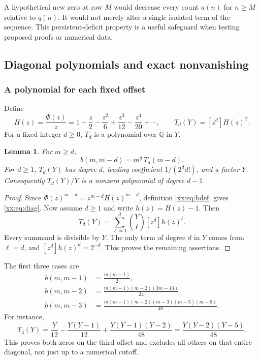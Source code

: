 \documentclass[11pt,a4paper]{article}
\numberwithin{equation}{section}
\newtheorem{lemma}[theorem]{Lemma}
\theoremstyle{definition}
\theoremstyle{remark}
\theoremstyle{plain}
\newcommand{\Q}{\mathbb Q}
\newcommand{\coef}[2]{[#1^{#2}]}
\newcommand{\fall}[2]{#1^{\underline{#2}}}
\begin{document}
A hypothetical new zero at row $M$ would decrease every count $a(n)$ for
$n\ge M$ relative to $q(n)$. It would not merely alter a single isolated
term of the sequence. This persistent-deficit property is a useful safeguard
when testing proposed proofs or numerical data.

\subsection{Diagonal polynomials and exact nonvanishing}\label{xx:sec:diagonals}

\subsubsection{A polynomial for each fixed offset}
Define
\begin{equation}\label{xx:eq:H}
 H(z)=\frac{\Phi(z)}z
 =1+\frac z2-\frac{z^2}{6}+\frac{z^3}{12}-\frac{z^4}{20}+\cdots,
 \qquad T_d(Y)=\coef{z}{d}H(z)^Y.
\end{equation}
For a fixed integer $d\ge0$, $T_d$ is a polynomial over $\Q$ in $Y$.

\begin{lemma}\label{xx:lem:diagdegree}
For $m\ge d$,
\begin{equation}\label{xx:eq:diag}
 b(m,m-d)=\fall m d\,T_d(m-d).
\end{equation}
For $d\ge1$, $T_d(Y)$ has degree $d$, leading coefficient $1/(2^d d!)$,
and a factor $Y$. Consequently $T_d(Y)/Y$ is a nonzero polynomial of
degree $d-1$.
\end{lemma}
\begin{proof}
Since $\Phi(z)^{m-d}=z^{m-d}H(z)^{m-d}$, definition \eqref{xx:eq:bdef} gives
\eqref{xx:eq:diag}. Now assume $d\ge1$ and write $h(z)=H(z)-1$. Then
\begin{equation}\label{xx:eq:Tbinomial}
 T_d(Y)=\sum_{\ell=1}^d\binom Y\ell\coef{z}{d}h(z)^\ell.
\end{equation}
Every summand is divisible by $Y$. The only term of degree $d$ in $Y$
comes from $\ell=d$, and $\coef{z}{d}h(z)^d=2^{-d}$. This proves the
remaining assertions.
\end{proof}

The first three cases are
\begin{align}
 b(m,m-1)&=\frac{m(m-1)}2,\label{xx:eq:d1}\\
 b(m,m-2)&=\frac{m(m-1)(m-2)(3m-13)}{24},\label{xx:eq:d2}\\
 b(m,m-3)&=\frac{m(m-1)(m-2)(m-3)(m-5)(m-8)}{48}.
 \label{xx:eq:d3}
\end{align}
For instance,
\[
 T_3(Y)=\frac{Y}{12}-\frac{Y(Y-1)}{12}
                  +\frac{Y(Y-1)(Y-2)}{48}
        =\frac{Y(Y-2)(Y-5)}{48}.
\]
This proves both zeros on the third offset and excludes all others on that
entire diagonal, not just up to a numerical cutoff.
\end{document}
